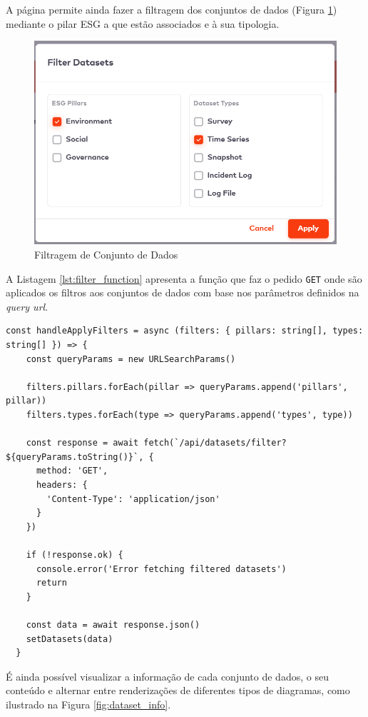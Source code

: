 A página permite ainda fazer a filtragem dos conjuntos de dados (Figura \ref{fig:dataset_filter}) mediante o pilar ESG a que estão associados e à sua tipologia.

\begin{figure}[H]
    \centering
    \includegraphics[width=4.5in,keepaspectratio]{frontmatter/assets/platform_prints/dataset/dataset_filter.png}
    \caption{Filtragem de Conjunto de Dados}
    \label{fig:dataset_filter}
\end{figure}

A Listagem \ref{lst:filter_function} apresenta a função que faz o pedido \texttt{GET} onde são aplicados os filtros aos conjuntos de dados com base nos parâmetros definidos na \textit{query url}.

\begin{lstlisting}[style=customts, caption={Função de Filtragem de Conjunto de Dados}, label={lst:filter_function}]
const handleApplyFilters = async (filters: { pillars: string[], types: string[] }) => {
    const queryParams = new URLSearchParams()

    filters.pillars.forEach(pillar => queryParams.append('pillars', pillar))
    filters.types.forEach(type => queryParams.append('types', type))

    const response = await fetch(`/api/datasets/filter?${queryParams.toString()}`, {
      method: 'GET',
      headers: {
        'Content-Type': 'application/json'
      }
    })

    if (!response.ok) {
      console.error('Error fetching filtered datasets')
      return
    }

    const data = await response.json()
    setDatasets(data)
  }
\end{lstlisting}


É ainda possível visualizar a informação de cada conjunto de dados, o seu conteúdo e alternar entre renderizações de diferentes tipos de diagramas, como ilustrado na Figura \ref{fig:dataset_info}.

